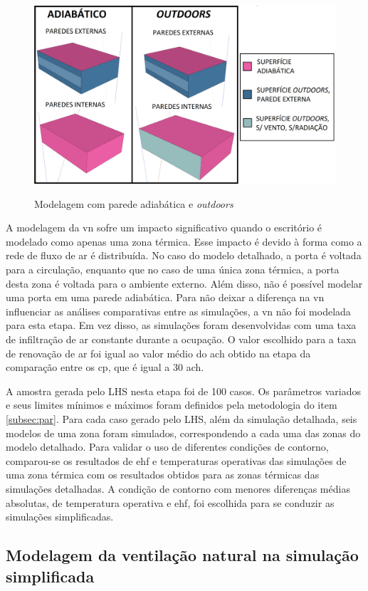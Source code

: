 \documentclass[brazil,hardcopy,openany]{ufscthesis} %
\begin{document}
\begin{figure}[h]
	\centering
	\caption{Modelagem com parede adiabática e \textit{outdoors}}
	\includegraphics[width=.7\linewidth]{img/adiabatic_outdoors2.png}
	\label{fig:adiabatic_outdoors}
\end{figure}


A modelagem da \acrlong{vn} sofre um impacto significativo quando o escritório é modelado como apenas uma zona térmica.
Esse impacto é devido à forma como a rede de fluxo de ar é distribuída. No caso do modelo detalhado, a porta é voltada para a circulação, enquanto que no caso de uma única zona térmica, a porta desta zona é voltada para o ambiente externo. 
Além disso, não é possível modelar uma porta em uma parede adiabática. Para não deixar a diferença na \acrlong{vn} influenciar as análises comparativas entre as simulações, a \acrlong{vn} não foi modelada para esta etapa.
Em vez disso, as simulações foram desenvolvidas com uma taxa de infiltração de ar constante durante a ocupação. O valor escolhido para a taxa de renovação de ar foi igual ao valor médio do \acrshort{ach} obtido na etapa da comparação entre os \acrshort{cp}, que é igual a 30 \acrshort{ach}.

A amostra gerada pelo LHS nesta etapa foi de 100 casos.
Os parâmetros variados e seus limites mínimos e máximos foram definidos pela metodologia do item \ref{subsec:par}.
Para cada caso gerado pelo LHS, além da simulação detalhada, seis modelos de uma zona foram simulados, correspondendo a cada uma das zonas do modelo detalhado.
Para validar o uso de diferentes condições de contorno, comparou-se os resultados de \acrshort{ehf} e temperaturas operativas das simulações de uma zona térmica com os resultados obtidos para as zonas térmicas das simulações detalhadas.
A condição de contorno com menores diferenças médias absolutas, de temperatura operativa e \acrshort{ehf}, foi escolhida para se conduzir as simulações simplificadas.

\subsection*{Modelagem da ventilação natural na simulação simplificada}
\end{document}
